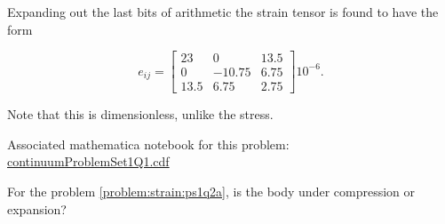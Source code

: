 \begin{Answer}[ref={problem:continuumProblemSet1:q1}]
Expanding out the last bits of arithmetic the strain tensor is found to have the form

\begin{equation}\label{eqn:continuumProblemSet1:230}
e_{ij}
=
\begin{bmatrix}
 23 & 0 & 13.5 \\
 0 & -10.75 & 6.75 \\
 13.5 & 6.75 & 2.75
\end{bmatrix}
 10^{-6}.
\end{equation}

Note that this is dimensionless, unlike the stress.

Associated mathematica notebook for this problem:
\href{https://raw.github.com/peeterjoot/physicsplay/master/notes/phy454/mathematica/continuumProblemSet1Q1.cdf}{continuumProblemSet1Q1.cdf}
\end{Answer}

\begin{Exercise}[title={Stress and strain relations for a small displacement}, label={problem:continuumProblemSet1:q2b}]
For the problem \ref{problem:strain:ps1q2a}, is the body under compression or expansion?
\end{Exercise}

